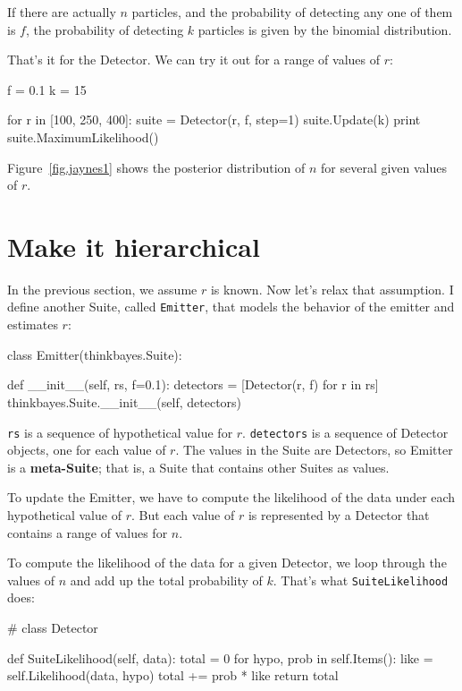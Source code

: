 \documentclass[12pt]{book}
\theoremstyle{exercise}
\begin{document}
If there are actually $n$ particles, and the probability of detecting
any one of them is $f$, the probability of detecting $k$ particles is
given by the binomial distribution.

That's it for the Detector.  We can try it out for a range
of values of $r$:

\begin{code}
    f = 0.1
    k = 15

    for r in [100, 250, 400]:
        suite = Detector(r, f, step=1)
        suite.Update(k)
        print suite.MaximumLikelihood()
\end{code}

Figure~\ref{fig.jaynes1} shows the posterior distribution of $n$ for
several given values of $r$.


\section{Make it hierarchical}

In the previous section, we assume $r$ is known.  Now let's
relax that assumption.  I define another Suite, called {\tt Emitter},
that models the behavior of the emitter and estimates $r$:

\begin{code}
class Emitter(thinkbayes.Suite):

    def __init__(self, rs, f=0.1):
        detectors = [Detector(r, f) for r in rs]
        thinkbayes.Suite.__init__(self, detectors)
\end{code}

{\tt rs} is a sequence of hypothetical value for $r$.  {\tt detectors}
is a sequence of Detector objects, one for each value of $r$.  The
values in the Suite are Detectors, so Emitter is a {\bf meta-Suite};
that is, a Suite that contains other Suites as values.

To update the Emitter, we have to compute the likelihood of the data
under each hypothetical value of $r$.  But each value of $r$ is
represented by a Detector that contains a range of values for $n$.

To compute the likelihood of the data for a given Detector, we loop
through the values of $n$ and add up the total probability of $k$.
That's what {\tt SuiteLikelihood} does:

\begin{code}
# class Detector

    def SuiteLikelihood(self, data):
        total = 0
        for hypo, prob in self.Items():
            like = self.Likelihood(data, hypo)
            total += prob * like
        return total
\end{code}
\end{document}
